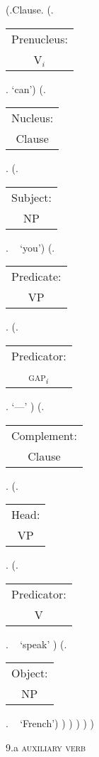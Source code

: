 \documentclass[12pt,letterpaper]{article}
\begin{document}
\begin{figure}
	\begin{center}
		\begin{parsetree}
			
			(.Clause.
			(.\begin{tabular}{c}Prenucleus:\\V$_i$\end{tabular}. `can')
			(.\begin{tabular}{c}Nucleus:\\Clause\end{tabular}.
			(.\begin{tabular}{c}Subject:\\NP\end{tabular}. ~ `you')
			(.\begin{tabular}{c}Predicate:\\VP\end{tabular}.
			(.\begin{tabular}{c}Predicator:\\\textsc{gap}$_i$\end{tabular}. `---' )
			(.\begin{tabular}{c}Complement:\\Clause\end{tabular}.
			(.\begin{tabular}{c}Head:\\VP\end{tabular}.
			(.\begin{tabular}{c}Predicator:\\V\end{tabular}. ~ `speak' )
			(.\begin{tabular}{c}Object:\\NP\end{tabular}. ~ `French')
			)
			)
			)
			)
			)
			
			\hfill \break\hfill \break
		\end{parsetree}
		9.a  \textsc{auxiliary verb}
	\end{center}
\end{figure}
\end{document}
